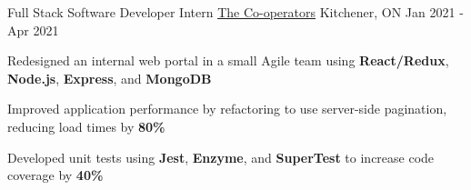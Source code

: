 \begin{cventries}
  \cventry
    {Full Stack Software Developer Intern} %
    {\href{https://www.cooperators.ca/}{The Co-operators}} %
    {Kitchener, ON} %
    {Jan 2021 - Apr 2021} %
    {
      \begin{cvitems} %
      \item {Redesigned an internal web portal in a small Agile team using \textbf{React/Redux}, \textbf{Node.js}, \textbf{Express}, and \textbf{MongoDB}}
      \item {Improved application performance by refactoring to use server-side pagination, reducing load times by \textbf{80\%}}
      \item {Developed unit tests using \textbf{Jest}, \textbf{Enzyme}, and \textbf{SuperTest} to increase code coverage by \textbf{40\%}}
      \end{cvitems}
    }
    
       
\end{cventries}
